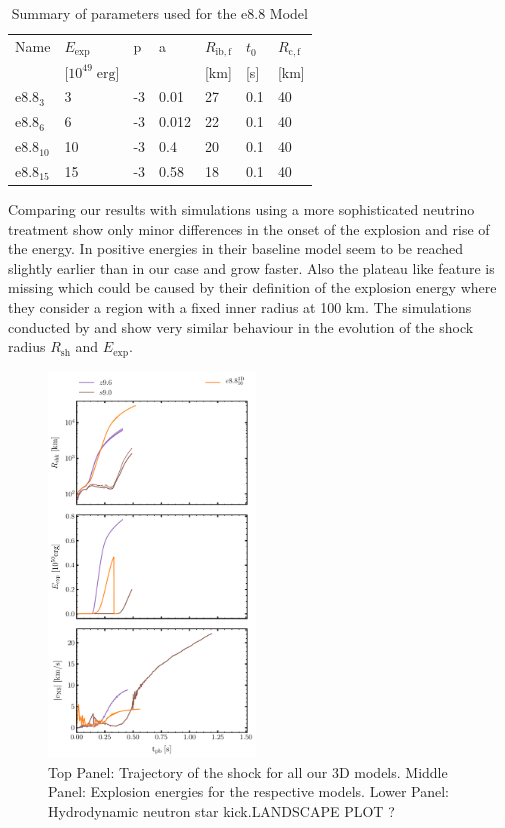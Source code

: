 \documentclass[fleqn,usenatbib]{mnras}
\newcommand{\COM}[1]{{\color{red}#1}}
\begin{document}
\begin{table}
   \begin{tabular}{l| l | l | l | l | l | l}
  \label{table:e8param}
  Name &$E_{\mathrm{exp}}$& p & a & $R_{\mathrm{ib,f}}$ & $t_0$ & $R_{\mathrm{c,f}}$\\
                & [$10^{49}\; \mathrm{erg}$] &   &   & [km]  & [s]& [km] \\
  \hline \hline
  $\mathrm{e}8.8_{3}$ &3    &    -3 & 0.01 &27 & 0.1 & 40 \\
  $\mathrm{e}8.8_{6}$ & 6   &   -3 & 0.012 &22 & 0.1 & 40 \\
  $\mathrm{e}8.8_{10}$ & 10     &   -3 & 0.4 & 20 & 0.1 & 40 \\
  $\mathrm{e}8.8_{15}$ & 15     &   -3 & 0.58 & 18 & 0.1 & 40 \\
  \end{tabular}
\caption{Summary of parameters used for the e8.8 Model}
\end{table}

Comparing our results with simulations using a more sophisticated neutrino treatment show only minor differences in the onset of the explosion and rise of the energy. In \cite{Radice2017} positive energies in their baseline model seem to be reached slightly earlier than in our case and grow faster. Also the plateau like feature is missing which could be caused by their definition of the explosion energy where they consider a region with a fixed inner radius at 100 km. The simulations conducted by \cite{Groote2014} and \cite{Janka2008} show very similar behaviour in the evolution of the shock radius $R_{\mathrm{sh}}$ and $E_{\mathrm{exp}}$. 

\begin{figure}
 \centering
 \includegraphics[width=0.49\textwidth]{pic/eexp_shk_kick_all_1d2d3d.pdf}
 \caption{Top Panel: Trajectory of the shock for all our 3D models. Middle Panel: Explosion energies for the respective models. Lower Panel: Hydrodynamic neutron star kick.\COM{LANDSCAPE PLOT ?}}
\label{fig:eexp kick 3D} 
\end{figure}
\end{document}
